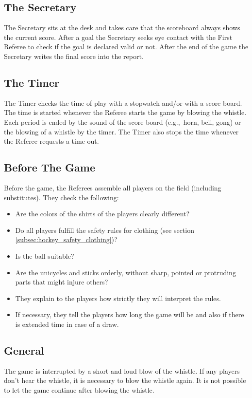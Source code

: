 \subsection{The Secretary}
The Secretary sits at the desk and takes care that the scoreboard always shows the current score.
After a goal the Secretary seeks eye contact with the First Referee to check if the goal is declared valid or not.
After the end of the game the Secretary writes the final score into the report.

\subsection{The Timer}
The Timer checks the time of play with a stopwatch and/or with a score board.
The time is started whenever the Referee starts the game by blowing the whistle.
Each period is ended by the sound of the score board (e.g.,\ horn, bell, gong) or the blowing of a whistle by the timer.
The Timer also stops the time whenever the Referee requests a time out.

\subsection{Before The Game}
Before the game, the Referees assemble all players on the field (including substitutes).
They check the following:
\begin{itemize}
\item Are the colors of the shirts of the players clearly different?
\item Do all players fulfill the safety rules for clothing (see section \ref{subsec:hockey_safety_clothing})?
\item Is the ball suitable?
\item Are the unicycles and sticks orderly, without sharp, pointed or protruding parts that might injure others?
\item They explain to the players how strictly they will interpret the rules.
\item If necessary, they tell the players how long the game will be and also if there is extended time in case of a draw.
\end{itemize}

\subsection{General}
The game is interrupted by a short and loud blow of the whistle.
If any players don't hear the whistle, it is necessary to blow the whistle again.
It is not possible to let the game continue after blowing the whistle.

